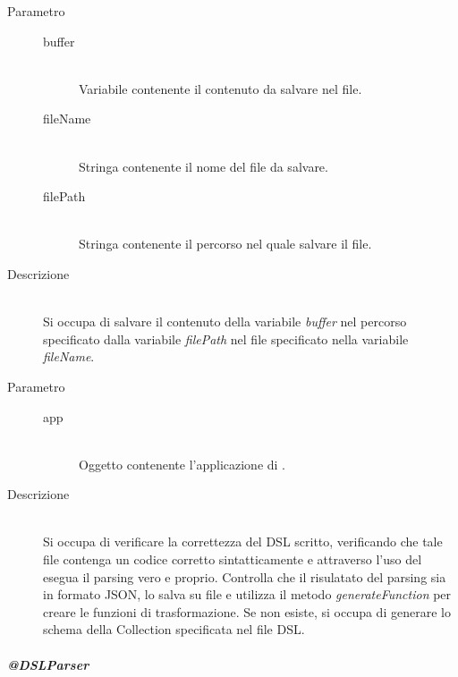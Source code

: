 \begin{description}
\begin{mldescription}
  \hfill 
  	\begin{description}
     		\item[Parametro] \hfill
     			\begin{description}
     				\item[buffer] \hfill \\
     				Variabile contenente il contenuto da salvare nel file.
     				\item[fileName] \hfill \\
     				Stringa contenente il nome del file da salvare.
     				\item[filePath] \hfill \\
     				Stringa contenente il percorso nel quale salvare il file.
     			\end{description}
     		\item[Descrizione] \hfill \\
     		Si occupa di salvare il contenuto della variabile \textit{buffer} nel percorso specificato dalla variabile \textit{filePath} nel file specificato nella variabile \textit{fileName}.
     \end{description}
     
  \hfill 
 	\begin{description}
    		\item[Parametro] \hfill
    			\begin{description}
    				\item[app] \hfill \\
    				Oggetto contenente l'applicazione di .
    			\end{description}
    		\item[Descrizione] \hfill \\
    		Si occupa di verificare la correttezza del DSL scritto, verificando che tale file contenga un codice corretto sintatticamente e attraverso l'uso del  esegua il parsing vero e proprio. Controlla che il risulatato del parsing sia in formato JSON, lo salva su file e utilizza il metodo \textit{generateFunction} per creare le funzioni di trasformazione. Se non esiste, si occupa di generare lo schema  della Collection specificata nel file DSL.
    \end{description}
 \end{mldescription}
 
\end{description}
\subparagraph{@DSLParser}
